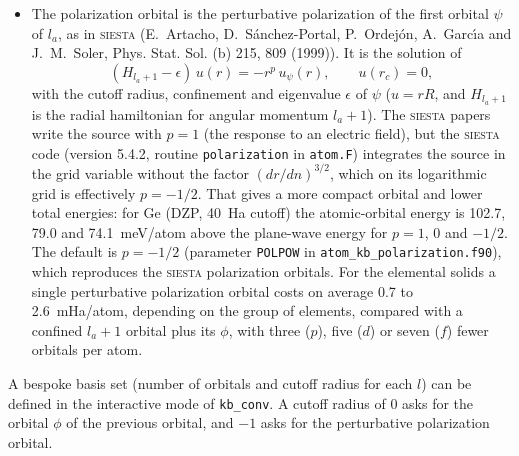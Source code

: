 \documentclass[11pt]{article}
\begin{document}
\begin{itemize}
    \begin{equation}
      (H-\epsilon) \phi(r) = \psi(r) - \frac{w(r) \psi(r)}{\langle \psi \mid w \mid \psi \rangle},
      \qquad \langle \psi \mid \phi \rangle =0, \qquad \phi(r_c) = 0,
    \end{equation}
    where $H$ includes the confining potential, $\epsilon$ is the eigenvalue of $\psi$,
    and $w(r) = \exp(-r_c/r)$ for $r < r_c$.
    It is calculated as $\phi = (\partial \psi_\lambda / \partial \lambda) / \langle \psi \mid w \mid \psi \rangle$,
    where $\psi_\lambda$ is the confined orbital of $H + \lambda w$,
    by finite differences in $\lambda$ with Richardson extrapolation.  It has one node and the same
    cutoff radius as $\psi$.
  \item
    The polarization orbital is the perturbative polarization of the first orbital $\psi$
    of $l_a$, as in \textsc{siesta} (E.~Artacho, D.~S\'anchez-Portal, P.~Ordej\'on, A.~Garc\'{\i}a
    and J.~M.~Soler, Phys. Stat. Sol. (b) 215, 809 (1999)).  It is the solution of
    \begin{equation}
       (H_{l_a+1} - \epsilon)\, u(r) = - r^{p}\, u_\psi(r), \qquad u(r_c) = 0,
    \end{equation}
    with the cutoff radius, confinement and eigenvalue $\epsilon$ of $\psi$
    ($u = rR$, and $H_{l_a+1}$ is the radial hamiltonian for angular momentum $l_a+1$).
    The \textsc{siesta} papers write the source with $p = 1$ (the response to an electric field),
    but the \textsc{siesta} code (version 5.4.2, routine \texttt{polarization} in \texttt{atom.F})
    integrates the source in the grid variable without the factor $(dr/dn)^{3/2}$, which on its
    logarithmic grid is effectively $p = -1/2$.
    That gives a more compact orbital and lower total energies:  for Ge (DZP, 40~Ha cutoff) the
    atomic-orbital energy is 102.7, 79.0 and 74.1~meV/atom above the plane-wave energy for
    $p = 1$, 0 and $-1/2$.  The default is $p = -1/2$ (parameter
    \texttt{POLPOW} in \texttt{atom\_kb\_polarization.f90}), which reproduces the \textsc{siesta}
    polarization orbitals.
    For the elemental solids a single perturbative polarization orbital costs on average 0.7 to
    2.6~mHa/atom, depending on the group of elements, compared with a confined $l_a+1$ orbital
    plus its $\phi$, with three ($p$), five ($d$) or seven ($f$) fewer orbitals per atom.
\end{itemize}
A bespoke basis set (number of orbitals and cutoff radius for each $l$) can be defined
in the interactive mode of \texttt{kb\_conv}.  A cutoff radius of 0 asks for the orbital $\phi$
of the previous orbital, and $-1$ asks for the perturbative polarization orbital.
\end{document}
